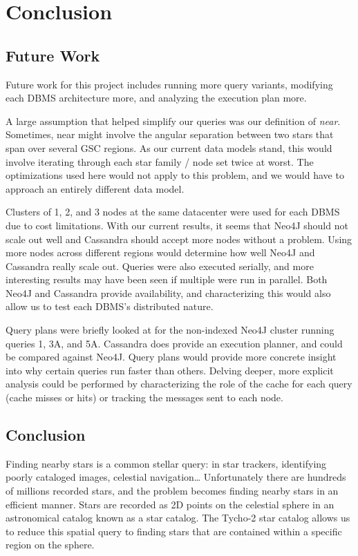 \section{Conclusion}\label{sec:conclusion}
\subsection{Future Work}\label{subsec:futureWork}
Future work for this project includes running more query variants, modifying each DBMS architecture more, and
analyzing the execution plan more.

A large assumption that helped simplify our queries was our definition of \textit{near}.
Sometimes, near might involve the angular separation between two stars that span over several GSC regions.
As our current data models stand, this would involve iterating through each star family / node set twice at worst.
The optimizations used here would not apply to this problem, and we would have to approach an entirely different data
model.
 
Clusters of 1, 2, and 3 nodes at the same datacenter were used for each DBMS due to cost limitations.
With our current results, it seems that Neo4J should not scale out well and Cassandra should accept more nodes without
a problem.
Using more nodes across different regions would determine how well Neo4J and Cassandra really scale out.
Queries were also executed serially, and more interesting results may have been seen if multiple were run in parallel.
Both Neo4J and Cassandra provide availability, and characterizing this would also allow us to test each DBMS's
distributed nature.

Query plans were briefly looked at for the non-indexed Neo4J cluster running queries 1, 3A, and 5A\@.
Cassandra does provide an execution planner, and could be compared against Neo4J\@.
Query plans would provide more concrete insight into why certain queries run faster than others.
Delving deeper, more explicit analysis could be performed by characterizing the role of the cache for each query 
(cache misses or hits) or tracking the messages sent to each node. 

\subsection{Conclusion}\label{subsec:conclusion}
Finding nearby stars is a common stellar query: in star trackers, identifying poorly cataloged images, celestial
navigation\ldots
Unfortunately there are hundreds of millions recorded stars, and the problem becomes finding nearby stars in an
efficient manner.
Stars are recorded as 2D points on the celestial sphere in an astronomical catalog known as a star catalog.
The Tycho-2 star catalog allows us to reduce this spatial query to finding stars that are contained within a specific
region on the sphere.

